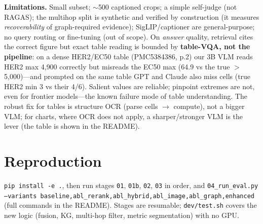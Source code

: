 \documentclass[10pt,oneside,a4paper]{article}
\begin{document}
\textbf{Limitations.} Small subset; $\sim$500 captioned crops; a simple self-judge
(not RAGAS); the multihop split is synthetic and verified by construction (it
measures \emph{recoverability} of graph-required evidence); SigLIP/captioner are
general-purpose; no query routing or fine-tuning (out of scope). On \emph{answer}
quality, retrieval cites the correct figure but exact table reading is bounded by
\textbf{table-VQA, not the pipeline}: on a dense HER2/EC50 table (PMC5384386, p.2)
our 3B VLM reads HER2 max 4{,}900 correctly but misreads the EC50 max (64.9 vs the
true $>$5{,}000)---and prompted on the same table GPT and Claude also miss cells
(true HER2 min 3 vs their 4/6). Salient values are reliable; pinpoint extremes are
not, even for frontier models---the known failure mode of table understanding. The
robust fix for tables is structure OCR (parse cells $\rightarrow$ compute), not a
bigger VLM; for charts, where OCR does not apply, a sharper/stronger VLM is the lever (the table is shown in the README).

\section{Reproduction}

\texttt{pip install -e .}, then run stages \texttt{01}, \texttt{01b}, \texttt{02},
\texttt{03} in order, and
\texttt{04\_run\_eval.py --variants baseline,\allowbreak abl\_rerank,\allowbreak abl\_hybrid,\allowbreak abl\_image,\allowbreak abl\_graph,\allowbreak enhanced}
(full commands in the README). Stages are resumable; \texttt{dev/test.sh} covers the
new logic (fusion, KG, multi-hop filter, metric segmentation) with no GPU.
\end{document}
